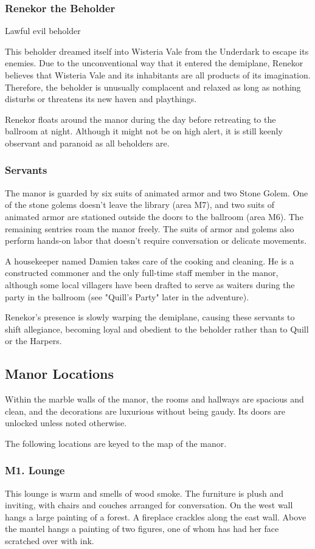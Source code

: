 \documentclass[10pt,a4paper,twoside,bg=print,twocolumn,openany,nodeprecatedcode]{dndbook}
\begin{document}
\subsubsection{Renekor the Beholder}
Lawful evil beholder

This beholder dreamed itself into Wisteria Vale from the Underdark to escape its enemies. Due to the unconventional way that it entered the demiplane, Renekor believes that Wisteria Vale and its inhabitants are all products of its imagination. Therefore, the beholder is unusually complacent and relaxed as long as nothing disturbs or threatens its new haven and playthings.

Renekor floats around the manor during the day before retreating to the ballroom at night. Although it might not be on high alert, it is still keenly observant and paranoid as all beholders are.

\subsubsection{Servants}
The manor is guarded by six suits of animated armor and two Stone Golem. One of the stone golems doesn't leave the library (area M7), and two suits of animated armor are stationed outside the doors to the ballroom (area M6). The remaining sentries roam the manor freely. The suits of armor and golems also perform hands-on labor that doesn't require conversation or delicate movements.

A housekeeper named Damien takes care of the cooking and cleaning. He is a constructed commoner and the only full-time staff member in the manor, although some local villagers have been drafted to serve as waiters during the party in the ballroom (see "Quill's Party" later in the adventure).

Renekor's presence is slowly warping the demiplane, causing these servants to shift allegiance, becoming loyal and obedient to the beholder rather than to Quill or the Harpers.

\subsection{Manor Locations}
Within the marble walls of the manor, the rooms and hallways are spacious and clean, and the decorations are luxurious without being gaudy. Its doors are unlocked unless noted otherwise.

The following locations are keyed to the map of the manor.

\subsubsection{M1. Lounge}
\begin{DndReadAloud}{}
This lounge is warm and smells of wood smoke. The furniture is plush and inviting, with chairs and couches arranged for conversation. On the west wall hangs a large painting of a forest. A fireplace crackles along the east wall. Above the mantel hangs a painting of two figures, one of whom has had her face scratched over with ink.

\end{DndReadAloud}
\end{document}
